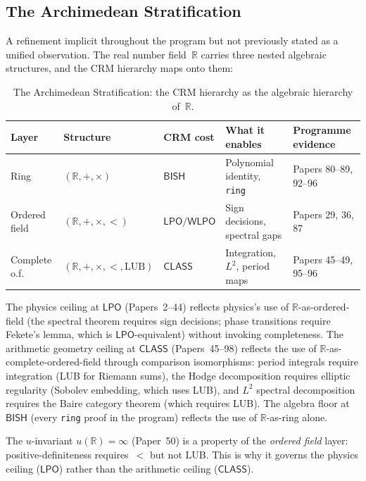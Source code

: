 \documentclass[11pt,a4paper]{article}
\theoremstyle{plain}
\theoremstyle{definition}
\newcommand{\BISH}{\textsf{BISH}}
\newcommand{\WLPO}{\textsf{WLPO}}
\newcommand{\LPO}{\textsf{LPO}}
\newcommand{\CLASS}{\textsf{CLASS}}
\newcommand{\R}{\mathbb{R}}
\begin{document}
\subsection{The Archimedean Stratification}\label{sec:stratification}

A refinement implicit throughout the program but not previously stated as a unified observation. The real number field~$\R$ carries three nested algebraic structures, and the CRM hierarchy maps onto them:

\begin{table}[ht]
\centering
\small
\begin{tabular}{@{}lllll@{}}
\toprule
\textbf{Layer} & \textbf{Structure} & \textbf{CRM cost} & \textbf{What it enables} & \textbf{Programme evidence} \\
\midrule
Ring & $(\R, +, \times)$ & $\BISH$ & Polynomial identity, \texttt{ring} & Papers 80--89, 92--96 \\
Ordered field & $(\R, +, \times, <)$ & $\LPO/\WLPO$ & Sign decisions, spectral gaps & Papers 29, 36, 87 \\
Complete o.f.\ & $(\R, +, \times, <, \mathrm{LUB})$ & $\CLASS$ & Integration, $L^2$, period maps & Papers 45--49, 95--96 \\
\bottomrule
\end{tabular}
\caption{The Archimedean Stratification: the CRM hierarchy as the algebraic hierarchy of~$\R$.}
\label{tab:stratification}
\end{table}

\noindent The physics ceiling at $\LPO$ (Papers~2--44) reflects physics's use of $\R$-as-ordered-field (the spectral theorem requires sign decisions; phase transitions require Fekete's lemma, which is $\LPO$-equivalent) without invoking completeness. The arithmetic geometry ceiling at $\CLASS$ (Papers~45--98) reflects the use of $\R$-as-complete-ordered-field through comparison isomorphisms: period integrals require integration (LUB for Riemann sums), the Hodge decomposition requires elliptic regularity (Sobolev embedding, which uses LUB), and $L^2$ spectral decomposition requires the Baire category theorem (which requires LUB). The algebra floor at $\BISH$ (every \texttt{ring} proof in the program) reflects the use of $\R$-as-ring alone.

The $u$-invariant $u(\R) = \infty$ (Paper~50) is a property of the \emph{ordered field} layer: positive-definiteness requires~$<$ but not LUB. This is why it governs the physics ceiling ($\LPO$) rather than the arithmetic ceiling ($\CLASS$).
\end{document}
